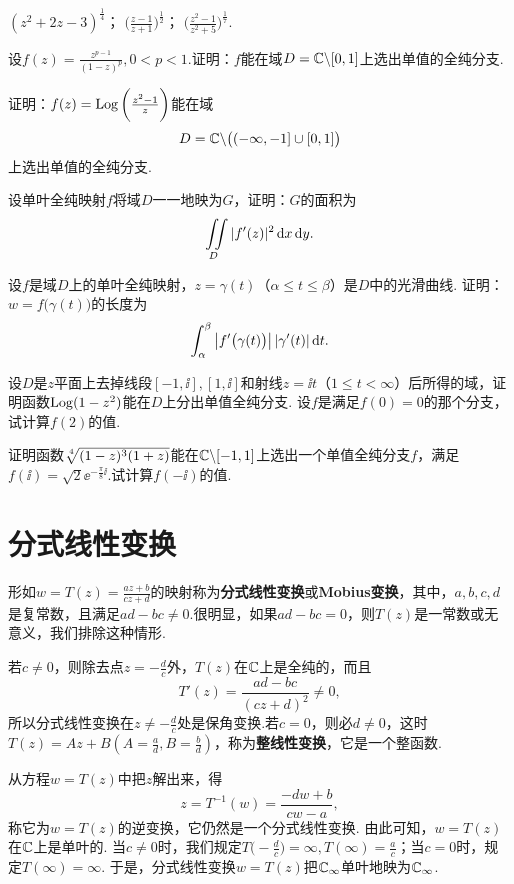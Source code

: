 \begin{xiti}
\begin{tasks}
      \task $(z^2+2z-3)^{\frac14}$；
      \task $\bigg(\frac{z-1}{z+1}\bigg)^{\frac12}$；
      \task $\bigg(\frac{z^2-1}{z^2+5}\bigg)^{\frac17}$.
    \end{tasks}
  \item 设$f(z)=\frac{z^{p-1}}{(1-z)^p},0<p<1$.证明：$f$能在域$D=\mathbb C\backslash[0,1]$上选出单值的全纯分支.
  \item 证明：$f(z)=\operatorname{Log}\bigg(\frac{z^2-1}z\bigg)$能在域
    \[
      D = \mathbb C \backslash \big((-\infty,-1]\cup[0,1]\big)
    \]
    上选出单值的全纯分支.
  \item 设单叶全纯映射$f$将域$D$一一地映为$G$，证明：$G$的面积为
    \[
      \iint\limits_D |f'(z)|^2 \mathop{}\!\mathrm dx\mathop{}\!\mathrm dy.
    \]
  \item 设$f$是域$D$上的单叶全纯映射，$z=\gamma(t)$（$\alpha\le t\le\beta$）是$D$中的光滑曲线. 证明：$w=f\big(\gamma(t)\big)$的长度为
    \[
      \int_\alpha^\beta\big| f'\big(\gamma(t)\big) \big|\,|\gamma'(t)|\mathop{}\!\mathrm{d} t.
    \]
  \item 设$D$是$z$平面上去掉线段$[-1,\ii],[1,\ii]$和射线$z=\ii t$（$1\le t<\infty$）后所得的域，证明函数$\operatorname{Log}(1-z^2)$能在$D$上分出单值全纯分支. 设$f$是满足$f(0)=0$的那个分支，试计算$f(2)$的值.
  \item 证明函数$\sqrt[\leftroot{-1}\uproot{2}4]{(1-z)^3(1+z)}$能在$\mathbb C\backslash[-1,1]$上选出一个单值全纯分支$f$，满足$f(\ii)=\sqrt2\ee^{-\frac\pi8\ii}$.试计算$f(-\ii)$的值.
\end{xiti}

\section{分式线性变换\label{sec2.5}}
形如$w=T(z)=\frac{az+b}{cz+d}$的映射称为\textbf{分式线性变换}或\textbf{Mobius变换}，其中，$a,b,c,d$是复常数，且满足$ad-bc\ne0$.很明显，如果$ad-bc=0$，则$T(z)$是一常数或无意义，我们排除这种情形.

若$c\ne0$，则除去点$z=-\frac dc$外，$T(z)$在$\mathbb C$上是全纯的，而且
\[
  T'(z) = \frac{ad-bc}{(cz+d)^2} \ne 0,
\]
所以分式线性变换在$z\ne-\frac dc$处是保角变换.若$c=0$，则必$d\ne0$，这时$T(z)=Az+B\left(A=\frac ad,B=\frac bd\right)$，称为\textbf{整线性变换}，它是一个整函数.

从方程$w=T(z)$中把$z$解出来，得
\[
  z = T^{-1}(w) = \frac{-dw+b}{cw-a},
\]
称它为$w=T(z)$的逆变换，它仍然是一个分式线性变换. 由此可知，$w=T(z)$在$\mathbb C$上是单叶的. 当$c\ne0$时，我们规定$T\bigg(-\frac dc\bigg)=\infty,T(\infty)=\frac ac$；当$c=0$时，规定$T(\infty)=\infty$. 于是，分式线性变换$w=T(z)$把$\mathbb C_\infty$单叶地映为$\mathbb C_\infty$.


